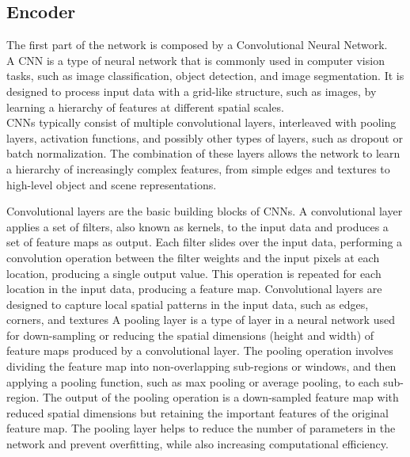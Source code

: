 \documentclass{article}
\begin{document}
\subsection{Encoder}
The first part of the network is composed by a Convolutional Neural Network.\\
A CNN is a type of neural network that is commonly used in computer vision tasks, such as image classification, object detection, and image segmentation. It is designed to process input data with a grid-like structure, such as images, by learning a hierarchy of features at different spatial scales.\\
CNNs typically consist of multiple convolutional layers, interleaved with pooling layers, activation functions, and possibly other types of layers, such as dropout or batch normalization.
The combination of these layers allows the network to learn a hierarchy of increasingly complex features, from simple edges and textures to high-level object and scene representations.\\
\begin{multicols}{2}
    Convolutional layers are the basic building blocks of CNNs. A convolutional layer applies a set of filters, also known as kernels, to the input data and produces a set of feature maps as output. Each filter slides over the input data, performing a convolution operation between the filter weights and the input pixels at each location, producing a single output value. This operation is repeated for each location in the input data, producing a feature map. Convolutional layers are designed to capture local spatial patterns in the input data, such as edges, corners, and textures\columnbreak
    A pooling layer is a type of layer in a neural network used for down-sampling or reducing the spatial dimensions (height and width) of feature maps produced by a convolutional layer. The pooling operation involves dividing the feature map into non-overlapping sub-regions or windows, and then applying a pooling function, such as max pooling or average pooling, to each sub-region. The output of the pooling operation is a down-sampled feature map with reduced spatial dimensions but retaining the important features of the original feature map. The pooling layer helps to reduce the number of parameters in the network and prevent overfitting, while also increasing computational efficiency.
\end{multicols}
\end{document}
